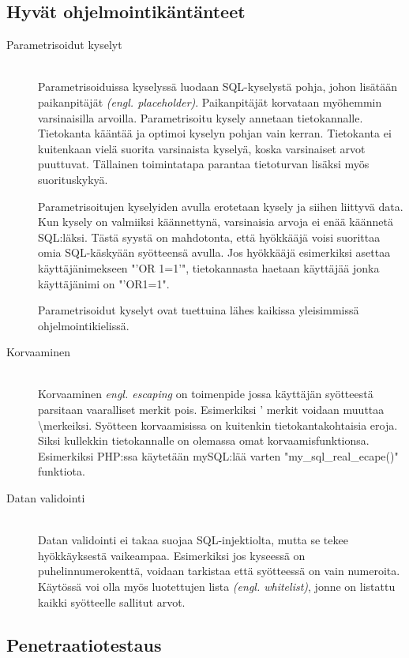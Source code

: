 \documentclass[finnish]{tktltiki2}
\theoremstyle{definition}
\theoremstyle{remark}
\begin{document}
\subsection{Hyvät ohjelmointikäntänteet}
\begin{description}
\item[Parametrisoidut kyselyt ] \hfill \\
Parametrisoiduissa kyselyssä luodaan SQL-kyselystä pohja, johon lisätään paikanpitäjät \textit{(engl. placeholder)}. Paikanpitäjät korvataan myöhemmin varsinaisilla arvoilla. Parametrisoitu kysely annetaan tietokannalle. Tietokanta kääntää ja optimoi kyselyn pohjan vain kerran. Tietokanta ei kuitenkaan vielä suorita varsinaista kyselyä, koska varsinaiset arvot puuttuvat. Tällainen toimintatapa parantaa tietoturvan lisäksi myös suorituskykyä.

Parametrisoitujen kyselyiden avulla erotetaan kysely ja siihen liittyvä data. Kun kysely on valmiiksi käännettynä, varsinaisia arvoja ei enää käännetä SQL:läksi. Tästä syystä on mahdotonta, että hyökkääjä voisi suorittaa omia SQL-käskyään syötteensä avulla. Jos hyökkääjä esimerkiksi asettaa käyttäjänimekseen "'OR 1=1'", tietokannasta haetaan käyttäjää jonka käyttäjänimi on "'OR1=1".

Parametrisoidut kyselyt ovat tuettuina lähes kaikissa yleisimmissä ohjelmointikielissä.

\item[Korvaaminen] \hfill \\
Korvaaminen \textit{engl. escaping} on toimenpide jossa käyttäjän syötteestä parsitaan vaaralliset merkit pois. Esimerkiksi ' merkit voidaan muuttaa \textbackslash merkeiksi. Syötteen korvaamisissa on kuitenkin tietokantakohtaisia eroja. Siksi kullekkin tietokannalle on olemassa omat korvaamisfunktionsa. Esimerkiksi PHP:ssa käytetään mySQL:lää varten "my{\_}sql{\_}real{\_}ecape()" funktiota.

\item[Datan validointi]\hfill \\
Datan validointi ei takaa suojaa SQL-injektiolta, mutta se tekee hyökkäyksestä vaikeampaa. Esimerkiksi jos kyseessä on puhelinnumerokenttä, voidaan tarkistaa että syötteessä on vain numeroita. Käytössä voi olla myös luotettujen lista \textit{(engl. whitelist)}, jonne on listattu kaikki syötteelle sallitut arvot.

\end{description}
\pagebreak
\subsection{Penetraatiotestaus}
\end{document}

